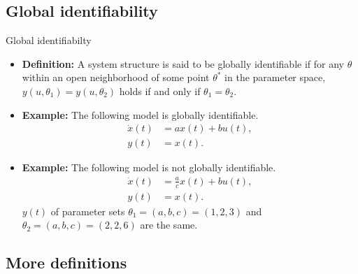 \documentclass[10pt]{beamer}
\begin{document}
\subsection{Global identifiability}

\begin{frame}{Global identifiabilty}
	\begin{itemize}
		\item \textbf{Definition: } A system structure is said to be globally identifiable if for any $\theta$ within an open neighborhood of some point $\theta^*$ in the parameter space, $y(u,\theta_1)=y(u,\theta_2)$ holds if and only if $\theta_1=\theta_2$.
		\item \textbf{Example: } The following model is globally identifiable.
			\begin{subequations} \label{eq:1}
				\begin{align}
					\dot x(t) &= a x(t) + b u(t), \\
					y(t) &= x(t).
				\end{align}
			\end{subequations}
		\item \textbf{Example: } The following model is not globally identifiable.
		\begin{subequations} \label{eq:2}
			\begin{align}
				\dot x(t) &= \frac{a}{c} x(t) + b u(t), \\
				y(t) &= x(t).
			\end{align}
		\end{subequations}
		$y(t)$ of parameter sets $\theta_1=(a,b,c)= (1,2,3)$ and $\theta_2=(a,b,c)= (2,2,6)$ are the same.
	\end{itemize}
	
\end{frame}

\subsection{More definitions}
\end{document}
